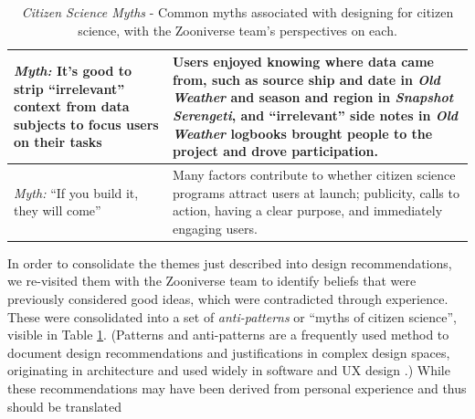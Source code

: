 \documentclass{sigchi}
\begin{document}
\begin{table}
\begin{center}
\begin{tabular}{p{4.5cm}p{13cm}}
\hline
\emph{Myth:} It's good to strip ``irrelevant'' context from data subjects to focus users on their tasks & Users enjoyed knowing where data came from, such as source ship and date in \emph{Old Weather} and season and region in \emph{Snapshot Serengeti}, and ``irrelevant'' side notes in \emph{Old Weather} logbooks brought people to the project and drove participation. \\
\hline
\emph{Myth:} ``If you build it, they will come'' &  Many factors contribute to whether citizen science programs attract users at launch; publicity, calls to action, having a clear purpose, and immediately engaging users. \\
\hline
\end{tabular}
\caption{\emph{Citizen Science Myths} - Common myths associated with designing for citizen science, with the Zooniverse team's perspectives on each.}
\label{tbl:myths}
\normalsize
\end{center}
\end{table}



In order to consolidate the themes just described into design recommendations, we re-visited them with the Zooniverse team to identify beliefs that were previously considered good ideas, which were contradicted through experience.  These were consolidated into a set of \emph{anti-patterns} or ``myths of citizen science'', visible in Table \ref{tbl:myths}.  (Patterns and anti-patterns are a frequently used method to  document design recommendations and justifications in complex design spaces, originating in architecture and used widely in software and UX design \cite{alexander2006pattern}.)  While these recommendations may have been derived from personal experience and thus  should be translated
\end{document}
